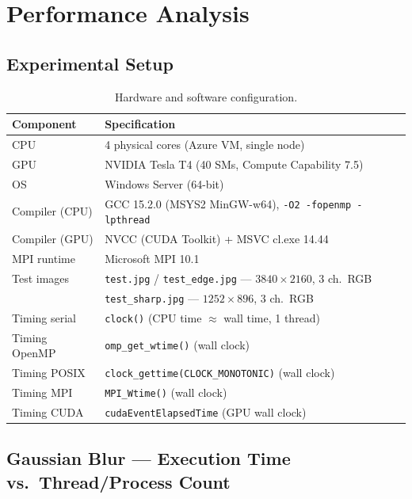 ﻿\documentclass[12pt,a4paper]{article}
\begin{document}
\section{Performance Analysis}

\subsection{Experimental Setup}

\begin{table}[H]
\centering
\caption{Hardware and software configuration.}
\label{tab:setup}
\begin{tabular}{ll}
\toprule
\textbf{Component} & \textbf{Specification} \\
\midrule
CPU            & 4 physical cores (Azure VM, single node) \\
GPU            & NVIDIA Tesla T4 (40 SMs, Compute Capability 7.5) \\
OS             & Windows Server (64-bit) \\
Compiler (CPU) & GCC 15.2.0 (MSYS2 MinGW-w64), \texttt{-O2 -fopenmp -lpthread} \\
Compiler (GPU) & NVCC (CUDA Toolkit) + MSVC cl.exe 14.44 \\
MPI runtime    & Microsoft MPI 10.1 \\
Test images    & \texttt{test.jpg} / \texttt{test\_edge.jpg} --- $3840\!\times\!2160$, 3 ch.\ RGB \\
               & \texttt{test\_sharp.jpg} --- $1252\!\times\!896$, 3 ch.\ RGB \\
Timing serial  & \texttt{clock()} (CPU time $\approx$ wall time, 1 thread) \\
Timing OpenMP  & \texttt{omp\_get\_wtime()} (wall clock) \\
Timing POSIX   & \texttt{clock\_gettime(CLOCK\_MONOTONIC)} (wall clock) \\
Timing MPI     & \texttt{MPI\_Wtime()} (wall clock) \\
Timing CUDA    & \texttt{cudaEventElapsedTime} (GPU wall clock) \\
\bottomrule
\end{tabular}
\end{table}

\subsection{Gaussian Blur --- Execution Time vs.\ Thread/Process Count}
\end{document}
